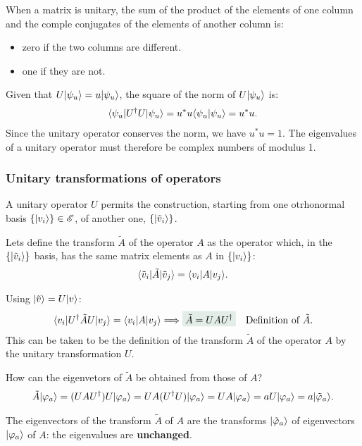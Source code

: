 \begin{emphasizer}
    When a matrix is unitary, the sum of the product of the elements of one column and the comple conjugates of the elements of another column is:
    \begin{itemize}[itemsep=0pt,topsep=0pt]
        \item zero if the two columns are different.
        \item one if they are not.
    \end{itemize}
\end{emphasizer}

Given that $U|\psi_u\rangle=u|\psi_u\rangle$, the square of the norm of $U|\psi_u\rangle$ is:
\begin{align*}
    \langle\psi_u|U^\dagger U|\psi_u\rangle=u^*u\langle\psi_u|\psi_u\rangle=u^*u.
\end{align*}
Since the unitary operator conserves the norm, we have $u^*u=1$. The eigenvalues of a unitary operator must therefore be complex numbers of modulus 1.
\subsubsection{Unitary transformations of operators}
A unitary operator $U$ permits the construction, starting from one otrhonormal basis $\{|v_i\rangle\}\in\mathscr{E}$, of another one, $\{|\tilde{v}_i\rangle\}$.

Lets define the transform $\tilde{A}$ of the operator $A$ as the operator which, in the $\{|\tilde{v}_i\rangle\}$ basis, has the same matrix elements as $A$ in $\{|v_i\rangle\}$:
\begin{align}
    \langle\tilde{v}_i|\tilde{A}|\tilde{v}_j\rangle=\langle v_i|A|v_j\rangle.
\end{align}

Using $|\tilde{v}\rangle=U|v\rangle$:
\begin{align*}
    \braket{v_i|U^\dagger\tilde{A}U|v_j}=\braket{v_i|A|v_j}\Longrightarrow\highlight{\tilde{A}=UAU^\dagger}\quad\text{Definition of $\tilde{A}$}.
\end{align*}
This can be taken to be the definition of the transform $\tilde{A}$ of the operator $A$ by the unitary transformation $U$.

How can the eigenvetors of $\tilde{A}$ be obtained from those of $A$?
\begin{align*}
    \tilde{A}|\varphi_a\rangle=(UAU^\dagger)U|\varphi_a\rangle=UA(U^\dagger U)|\varphi_a\rangle=UA|\varphi_a\rangle=aU|\varphi_a\rangle=a|\tilde{\varphi}_a\rangle.
\end{align*}
\begin{emphasizer}
    The eigenvectors of the transform $\tilde{A}$ of $A$ are the transforms $|\tilde{\varphi}_a\rangle$ of eigenvectors $|\varphi_a\rangle$ of $A$: the eigenvalues are 
    \textbf{unchanged}.
\end{emphasizer}

